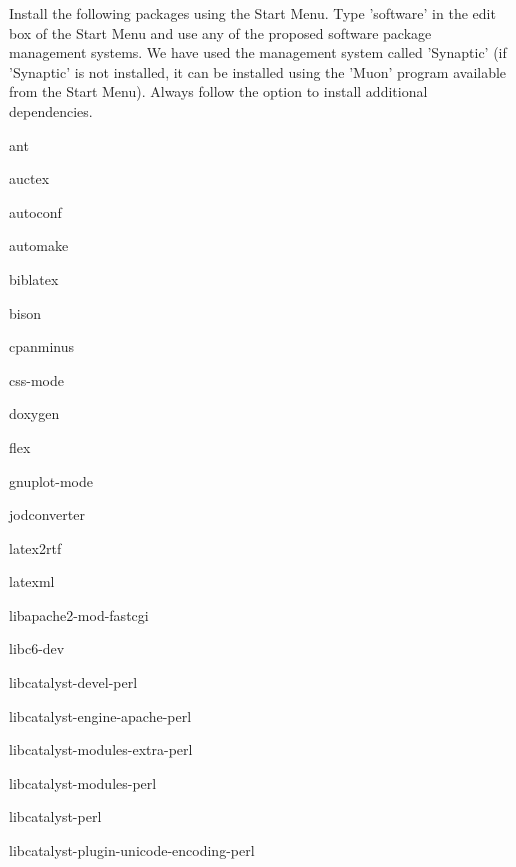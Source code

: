 \documentclass[12pt]{article}
\begin{document}
Install the following packages using the Start Menu.  Type 'software'
in the edit box of the Start Menu and use any of the proposed software
package management systems.  We have used the management system called
'Synaptic' (if 'Synaptic' is not installed, it can be installed using
the 'Muon' program available from the Start Menu).  Always follow the
option to install additional dependencies.
\begin{description} 
\item ant
\item auctex
\item autoconf
\item automake
\item biblatex
\item bison
\item cpanminus
\item css-mode
\item doxygen
\item flex
\item gnuplot-mode
\item jodconverter
\item latex2rtf
\item latexml
\item libapache2-mod-fastcgi
\item libc6-dev
\item libcatalyst-devel-perl
\item libcatalyst-engine-apache-perl
\item libcatalyst-modules-extra-perl
\item libcatalyst-modules-perl
\item libcatalyst-perl

\item libcatalyst-plugin-unicode-encoding-perl


\end{description}
\end{document}
